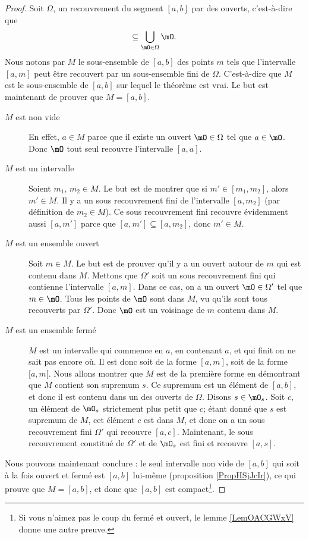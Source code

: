 \begin{proof}
    Soit $\Omega$, un recouvrement du segment $[a,b]$ par des ouverts, c'est-à-dire que
    \begin{equation}
        [a,b]\subseteq\bigcup_{\mO\in\Omega}\mO.
    \end{equation}
    Nous notons par $M$ le sous-ensemble de $[a,b]$ des points $m$ tels que l'intervalle $[a,m]$ peut être recouvert par un sous-ensemble fini de $\Omega$. C'est-à-dire que $M$ est le sous-ensemble de $[a,b]$ sur lequel le théorème est vrai. Le but est maintenant de prouver que $M=[a,b]$.
    \begin{description}
        \item[$M$ est non vide] En effet, $a\in M$ parce que il existe un ouvert $\mO\in\Omega$ tel que $a\in\mO$. Donc $\mO$ tout seul recouvre l'intervalle $[a,a]$.
        \item[$M$ est un intervalle] Soient $m_1$, $m_2\in M$. Le but est de montrer que si $m'\in[m_1,m_2]$, alors $m'\in M$. Il y a un sous recouvrement fini de l'intervalle $[a,m_2]$ (par définition de $m_2\in M$). Ce sous recouvrement fini recouvre évidemment aussi $[a,m']$ parce que $[a,m']\subseteq [a,m_2]$, donc $m'\in M$.
        \item[$M$ est un ensemble ouvert] Soit $m\in M$. Le but est de prouver qu'il y a un ouvert autour de $m$ qui est contenu dans $M$. Mettons que $\Omega'$ soit un sous recouvrement fini qui contienne l'intervalle $[a,m]$. Dans ce cas, on a un ouvert $\mO\in\Omega'$ tel que $m\in\mO$. Tous les points de $\mO$ sont dans $M$, vu qu'ils sont tous recouverts par $\Omega'$. Donc $\mO$ est un voisinage de $m$ contenu dans $M$.
        \item[$M$ est un ensemble fermé] $M$ est un intervalle qui commence en $a$, en contenant $a$, et qui finit on ne sait pas encore où. Il est donc soit de la forme $[a,m]$, soit de la forme $[a,m[$. Nous allons montrer que $M$ est de la première forme en démontrant que $M$ contient son supremum $s$. Ce supremum est un élément de $[a,b]$, et donc il est contenu dans un des ouverts de $\Omega$. Disons $s\in\mO_s$. Soit $c$, un élément de $\mO_s$ strictement plus petit que $c$; étant donné que $s$ est supremum de $M$, cet élément $c$ est dans $M$, et donc on a un sous recouvrement fini $\Omega'$ qui recouvre $[a,c]$. Maintenant, le sous recouvrement constitué de $\Omega'$ et de $\mO_s$ est fini et recouvre $[a,s]$.
    \end{description}
    Nous pouvons maintenant conclure : le seul intervalle non vide de $[a,b]$ qui soit à la fois ouvert et fermé est $[a,b]$ lui-même (proposition \ref{PropHSjJcIr}), ce qui prouve que $M=[a,b]$, 
    et donc que $[a,b]$ est compact\footnote{Si vous n'aimez pas le coup du fermé et ouvert, le lemme \ref{LemOACGWxV} donne une autre preuve.}.
\end{proof}


